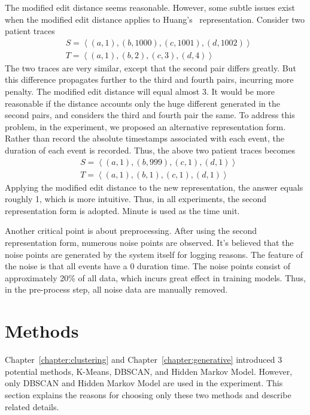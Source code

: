 The modified edit distance seems reasonable. However, some subtle issues exist when the modified edit distance applies to Huang's~\cite{huang2012anomaly} representation. Consider two patient traces 
\begin{align*}
	&S = \left\langle (a, 1), (b, 1000), (c, 1001), (d, 1002)\right\rangle 	\\
	&T = \left\langle(a, 1), (b, 2), (c, 3), (d, 4)\right\rangle 
\end{align*}
The two traces are very similar, except that the second pair differs greatly. But this difference propagates further to the third and fourth pairs, incurring more penalty. The modified edit distance will equal almost 3. It would be more reasonable if the distance accounts only the huge different generated in the second pairs, and considers the third and fourth pair the same. To address this problem, in the experiment, we proposed an alternative representation form. Rather than record the absolute timestamps associated with each event, the duration of each event is recorded. Thus, the above two patient traces becomes
\begin{align*}
	&S = \left\langle (a, 1), (b, 999), (c, 1), (d, 1)\right\rangle 	\\
	&T = \left\langle(a, 1), (b, 1), (c, 1), (d, 1)\right\rangle 
\end{align*}
Applying the modified edit distance to the new representation, the answer equals roughly 1, which is more intuitive. Thus, in all experiments, the second representation form is adopted. Minute is used as the time unit.

Another critical point is about preprocessing. After using the second representation form, numerous noise points are observed. It's believed that the noise points are generated by the system itself for logging reasons. The feature of the noise is that all events have a 0 duration time. The noise points consist of approximately 20\% of all data, which incurs great effect in training models. Thus, in the pre-process step, all noise data are manually removed.

\section{Methods}
Chapter~\ref{chapter:clustering} and Chapter~\ref{chapter:generative} introduced 3 potential methods, K-Means, DBSCAN, and Hidden Markov Model. However, only DBSCAN and Hidden Markov Model are used in the experiment. This section explains the reasons for choosing only these two methods and describe related details.

